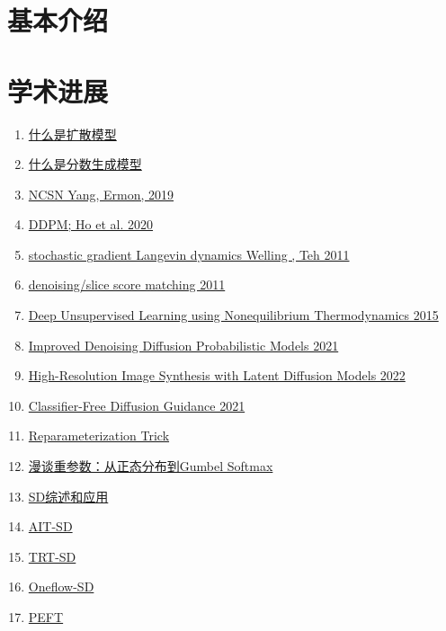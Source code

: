 \section{基本介绍}






\section{学术进展}
\begin{enumerate}
  \item \href{https://lilianweng.github.io/posts/2021-07-11-diffusion-models/}{什么是扩散模型}
  \item \href{http://yang-song.net/blog/2021/score/}{什么是分数生成模型}
  \item \href{https://arxiv.org/abs/1907.05600}{NCSN Yang, Ermon, 2019}
  \item \href{https://arxiv.org/abs/2006.11239}{DDPM; Ho et al. 2020}
  \item \href{https://www.stats.ox.ac.uk/~teh/research/compstats/WelTeh2011a.pdf}{stochastic gradient Langevin dynamics Welling , Teh 2011}
  \item \href{http://www.iro.umontreal.ca/~vincentp/Publications/smdae_techreport.pdf}{denoising/slice score matching 2011}
  \item \href{https://arxiv.org/abs/1503.03585}{Deep Unsupervised Learning using Nonequilibrium Thermodynamics 2015}
  \item \href{https://arxiv.org/abs/2102.09672}{Improved Denoising Diffusion Probabilistic Models 2021}
  \item \href{https://arxiv.org/abs/2112.10752}{High-Resolution Image Synthesis with Latent Diffusion Models 2022}
  \item \href{https://openreview.net/forum?id=qw8AKxfYbI}{Classifier-Free Diffusion Guidance 2021}
  \item \href{https://sassafras13.github.io/ReparamTrick/}{Reparameterization Trick}
  \item \href{https://kexue.fm/archives/6705}{漫谈重参数：从正态分布到Gumbel Softmax}
  \item \href{https://github.com/YangLing0818/Diffusion-Models-Papers-Survey-Taxonomy}{SD综述和应用}
  \item \href{https://github.com/facebookincubator/AITemplate/tree/main/examples/05_stable_diffusion}{AIT-SD}
  \item \href{https://github.com/NVIDIA/TensorRT/tree/release/8.6/demo/Diffusion}{TRT-SD}
  \item \href{https://github.com/Oneflow-Inc/diffusers}{Oneflow-SD}
  \item \href{https://github.com/huggingface/peft}{PEFT}
\end{enumerate}

